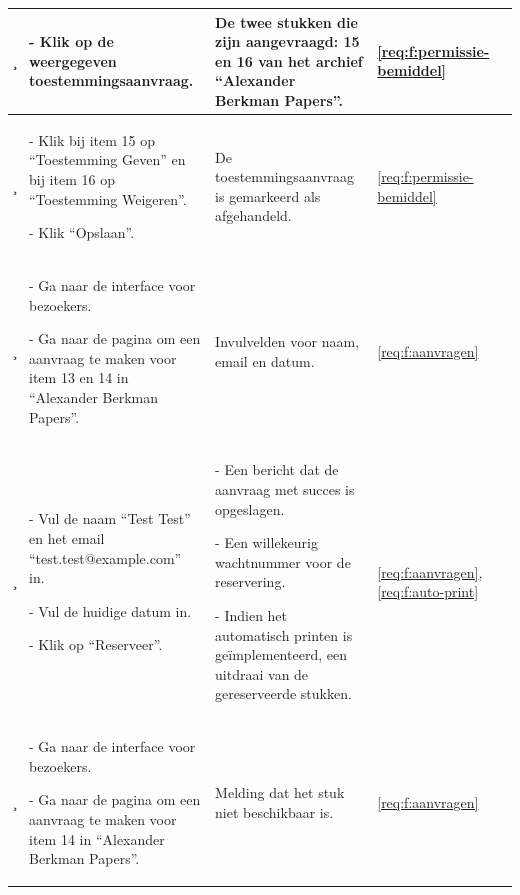 \documentclass[a4paper,titlepage]{report}
\begin{document}
\begin{longtable}{| m{} | m{}
      | m{} | m{} | m{} |}
      \c &
      \par - Klik op de weergegeven toestemmingsaanvraag.
      & \par De twee stukken die zijn aangevraagd: 15 en 16 van het archief
      ``Alexander Berkman Papers''.
      & \ref{req:f:permissie-bemiddel}
      & \\\hline

      \c &
      \par - Klik bij item 15 op ``Toestemming Geven'' en bij item 16 op
      ``Toestemming Weigeren''.
      \par - Klik ``Opslaan''.
      & \par De toestemmingsaanvraag is gemarkeerd als afgehandeld.
      & \ref{req:f:permissie-bemiddel}
      & \\\hline
      \hline


      \c &
      \par - Ga naar de interface voor bezoekers.
      \par - Ga naar de pagina om een aanvraag te maken voor item 13 en 14 in
      ``Alexander Berkman Papers''.
      & \par Invulvelden voor naam, email en datum.
      & \ref{req:f:aanvragen}
      & \\\hline

      \c &
      \par - Vul de naam ``Test Test'' en het email ``test.test@example.com''
        in.
      \par - Vul de huidige datum in.
      \par - Klik op ``Reserveer''.
      & \par - Een bericht dat de aanvraag met succes is opgeslagen.
        \par - Een willekeurig wachtnummer voor de reservering.
        \par - Indien het automatisch printen is ge\"implementeerd, een uitdraai
        van de gereserveerde stukken.
      & \ref{req:f:aanvragen}, \ref{req:f:auto-print}
      & \\\hline

      \c &
      \par - Ga naar de interface voor bezoekers.
      \par - Ga naar de pagina om een aanvraag te maken voor item 14 in
      ``Alexander Berkman Papers''.
      & \par Melding dat het stuk niet beschikbaar is.
      & \ref{req:f:aanvragen}
      & \\\hline


\end{longtable}
\end{document}
